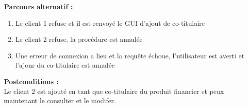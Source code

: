 \documentclass[../rapport.tex]{subfiles}
\begin{document}
\textbf{Parcours alternatif :}
\begin{enumerate}
    \item Le client 1 refuse et il est renvoyé le GUI d’ajout de co-titulaire
    \item Le client 2 refuse, la procédure est annulée 
    \item Une erreur de connexion a lieu et la requête échoue, l’utilisateur est averti et l’ajour du co-titulaire est annulée
\end{enumerate}

\textbf{Postconditions :} \\
Le client 2 est ajouté en tant que co-titulaire du produit financier et peux maintenant le consulter et le modifer. \\

\newpage
\end{document}
